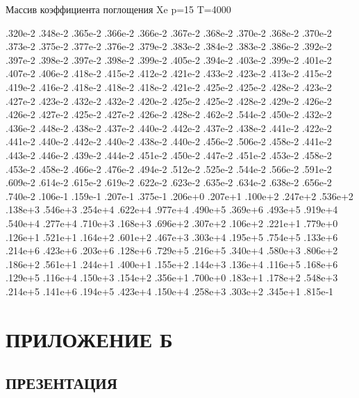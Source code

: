 \noindent Массив коэффициента поглощения Xe p=15 T=4000

\noindent .320e‑2 .348e‑2 .365e‑2 .366e‑2 .366e‑2 .367e‑2 .368e‑2 .370e‑2 .368e‑2 .370e‑2 .373e‑2 .375e‑2 .377e‑2 .376e‑2 .379e‑2 .383e‑2 .384e‑2 .383e‑2 .386e‑2 .392e‑2 .397e‑2 .398e‑2 .397e‑2 .398e‑2 .399e‑2 .405e‑2 .394e‑2 .403e‑2 .399e‑2 .401e‑2 .407e‑2 .406e‑2 .418e‑2 .415e‑2 .412e‑2 .421e‑2 .433e‑2 .423e‑2 .413e‑2 .415e‑2 .419e‑2 .416e‑2 .418e‑2 .418e‑2 .418e‑2 .421e‑2 .425e‑2 .425e‑2 .428e‑2 .423e‑2 .427e‑2 .423e‑2 .432e‑2 .432e‑2 .420e‑2 .425e‑2 .425e‑2 .428e‑2 .429e‑2 .426e‑2 .426e‑2 .427e‑2 .425e‑2 .427e‑2 .426e‑2 .428e‑2 .462e‑2 .544e‑2 .450e‑2 .432e‑2 .436e‑2 .448e‑2 .438e‑2 .437e‑2 .440e‑2 .442e‑2 .437e‑2 .438e‑2 .441e‑2 .422e‑2 .441e‑2 .440e‑2 .442e‑2 .440e‑2 .438e‑2 .440e‑2 .456e‑2 .506e‑2 .458e‑2 .441e‑2 .443e‑2 .446e‑2 .439e‑2 .444e‑2 .451e‑2 .450e‑2 .447e‑2 .451e‑2 .453e‑2 .458e‑2 .453e‑2 .458e‑2 .466e‑2 .476e‑2 .494e‑2 .512e‑2 .525e‑2 .544e‑2 .566e‑2 .591e‑2 .609e‑2 .614e‑2 .615e‑2 .619e‑2 .622e‑2 .623e‑2 .635e‑2 .634e‑2 .638e‑2 .656e‑2 .740e‑2 .106e‑1 .159e‑1 .207e‑1 .375e‑1 .206e+0 .207e+1 .100e+2 .247e+2 .536e+2 .138e+3 .546e+3 .254e+4 .622e+4 .977e+4 .490e+5 .369e+6 .493e+5 .919e+4 .540e+4 .277e+4 .710e+3 .168e+3 .696e+2 .307e+2 .106e+2 .221e+1 .779e+0 .126e+1 .521e+1 .164e+2 .601e+2 .467e+3 .303e+4 .195e+5 .754e+5 .133e+6 .214e+6 .423e+6 .203e+6 .128e+6 .729e+5 .216e+5 .340e+4 .580e+3 .806e+2 .186e+2 .561e+1 .244e+1 .400e+1 .155e+2 .144e+3 .136e+4 .116e+5 .168e+6 .129e+5 .116e+4 .150e+3 .154e+2 .356e+1 .700e+0 .183e+1 .178e+2 .548e+3 .214e+5 .141e+6 .194e+5 .423e+4 .150e+4 .258e+3 .303e+2 .345e+1 .815e‑1

\chapter*{ПРИЛОЖЕНИЕ Б}\label{toc:attachment-b}
\titleformat{\section}{\bigsize\centering\bfseries}{\thesection}{}{}{}{}
\section*{ПРЕЗЕНТАЦИЯ}
